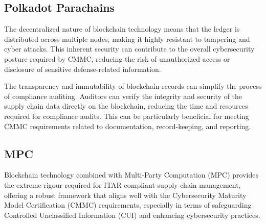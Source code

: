 \documentclass{tufte-handout}
\begin{document}
\subsection{Polkadot Parachains}\label{sec:headings}

The decentralized nature of blockchain technology means that the ledger is distributed across multiple nodes, making it highly resistant to tampering and cyber attacks.
This inherent security can contribute to the overall cybersecurity posture required by CMMC, reducing the risk of unauthorized access or disclosure of sensitive defense-related information.

The transparency and immutability of blockchain records can simplify the process of compliance auditing. Auditors can verify the integrity and security of the supply chain data
directly on the blockchain, reducing the time and resources required for compliance audits. This can be particularly beneficial for meeting CMMC requirements related to documentation,
record-keeping, and reporting.

\subsection{MPC}\label{sec:headings}
Blockchain technology combined with Multi-Party Computation (MPC) provides the extreme rigour required  for ITAR compliant supply chain management, offering a robust framework
that aligns well with the Cybersecurity Maturity Model Certification (CMMC) requirements, especially in terms of safeguarding Controlled Unclassified Information (CUI) and
enhancing cybersecurity practices.
\end{document}
